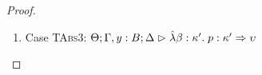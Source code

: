\begin{proof}
\begin{enumerate}
  First, the syntax:
  \begin{tabbedproof}
    \oo By inversion, $\judgeA[\Theta; \Gamma, y:B, x:A; \Delta]{p}{\upsilon}$ \\
    \oo By induction, $\judgeA[\Theta; \Gamma, x:A; \Delta]{[e''/y]p}{\upsilon}$ \\
    \oo By rule, $\judgeA[\Theta; \Gamma; \Delta]{\pfun{x}{A}{[e''/y]p}}{A \To \upsilon}$ \\
    \oo By def of subst, $\judgeA[\Theta; \Gamma; \Delta]{[e''/y](\pfun{x}{A}{p})}{(A \To \upsilon)}$ \\
  \end{tabbedproof}
  For semantics, consider $\interp{\judgeA[\Theta; \Gamma; \Delta]{[e''/y](\pfun{x}{A}{p})}{(A \To \upsilon)}}\;\theta\;\gamma\;\delta$ \\
  \begin{eqnproof}
          {Semantics}
          {Induction}
          {Semantics}
  \end{eqnproof}
  We silently permute arguments in the second line. 

\item Case \textsc{TAbs3}: $\judgeA[\Theta; \Gamma, y:B; \Delta]{\pfun{\beta}{\kappa'}{p}}{\kappa' \To \upsilon}$
  

\end{enumerate}
\end{proof}
